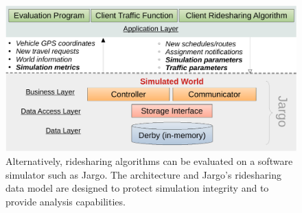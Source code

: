 \begin{figure}[h]
\centering
\includegraphics[width=120mm]{src/fig/architecture}
\caption{Alternatively, ridesharing algorithms can be evaluated on a software
simulator such as Jargo. The architecture and Jargo's ridesharing data model
are designed to protect simulation integrity and to provide analysis
capabilities.}
\label{fig:architecture}
\end{figure}

